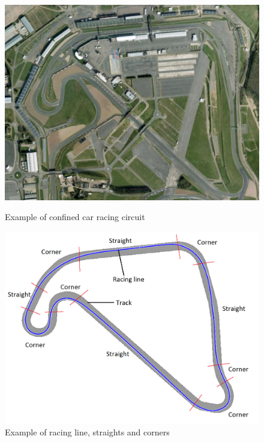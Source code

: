 \begin{figure}
	\centering
	\begin{minipage}{0.45\textwidth}
		\centering
		\includegraphics[width=\textwidth]{images/confinedCircuit}
		\caption{Example of confined car racing circuit}
		\label{fig:circuit-overhead}
	\end{minipage}\hfill
	\begin{minipage}{0.45\textwidth}
		\centering
		\includegraphics[width=\textwidth]{images/exampleofraceline}
		\caption{Example of racing line, straights and corners}
		\label{fig:circuit-breakdown}
	\end{minipage}
\end{figure}

